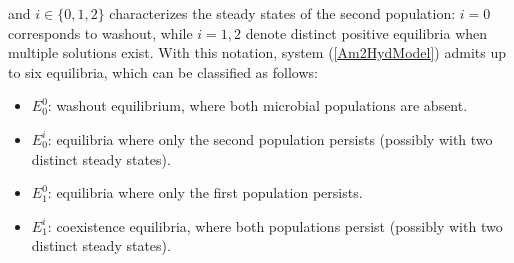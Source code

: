 \documentclass[runningheads]{llncs}
\begin{document}
and $i\in\{0,1,2\}$ characterizes the steady states of the second population: $i=0$ corresponds to washout, while $i=1,2$ denote distinct positive equilibria when multiple solutions exist. 
With this notation, system (\ref{Am2HydModel}) admits up to six equilibria, which can be classified as follows:
\begin{itemize}[leftmargin=*]
\item $E_0^0$: washout equilibrium, where both microbial populations are absent.
\item $E_0^i$: equilibria where only the second population persists (possibly with two distinct steady states).
\item $E_1^0$: equilibria where only the first population persists.
\item $E_1^i$: coexistence equilibria, where both populations persist (possibly with two distinct steady states).
\end{itemize}
\end{document}
